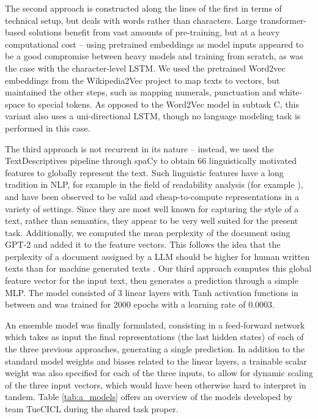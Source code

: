 The second approach is constructed along the lines of the first in terms of technical setup, but deals with words rather than characters.
Large transformer-based solutions benefit from vast amounts of pre-training, but at a heavy computational cost -- using pretrained embeddings as model inputs appeared to be a good compromise between heavy models and training from scratch, as was the case with the character-level LSTM.
We used the pretrained Word2vec embeddings from the Wikipedia2Vec \citep{yamada2020wikipedia2vec} project to map texts to vectors, but maintained the other steps, such as mapping numerals, punctuation and white-space to special tokens.
As opposed to the Word2Vec model in subtask C, this variant also uses a uni-directional LSTM, though no language modeling task is performed in this case.

The third approach is not recurrent in its nature -- instead, we used the TextDescriptives pipeline \citep{Hansen_2023} through spaCy \citep{honnibal2020spacy} to obtain 66 linguistically motivated features to globally represent the text.
Such linguistic features have a long tradition in NLP, for example in the field of readability analysis (for example \citealp{vajjala-meurers-2012-improving}), and have been observed to be valid and cheap-to-compute representations in a variety of settings.
Since they are most well known for capturing the style of a text, rather than semantics, they appear to be very well suited for the present task.
Additionally, we computed the mean perplexity of the document using GPT-2 \citep{Radford2019} and added it to the feature vectors.
This follows the idea that the perplexity of a document assigned by a LLM should be higher for human written texts than for machine generated texts \citep{chaka2023detecting}.
Our third approach computes this global feature vector for the input text, then generates a prediction through a simple MLP.
The model consisted of 3 linear layers with Tanh activation functions in between and was trained for 2000 epochs with a learning rate of 0.0003.

An ensemble model was finally formulated, consisting in a feed-forward network which takes as input the final representations (the last hidden states) of each of the three previous approaches, generating a single prediction.
In addition to the standard model weights and biases related to the linear layers, a trainable scalar weight was also specified for each of the three inputs, to allow for dynamic scaling of the three input vectors, which would have been otherwise hard to interpret in tandem.
Table \ref{tab:a_models} offers an overview of the models developed by team TueCICL during the shared task proper.

